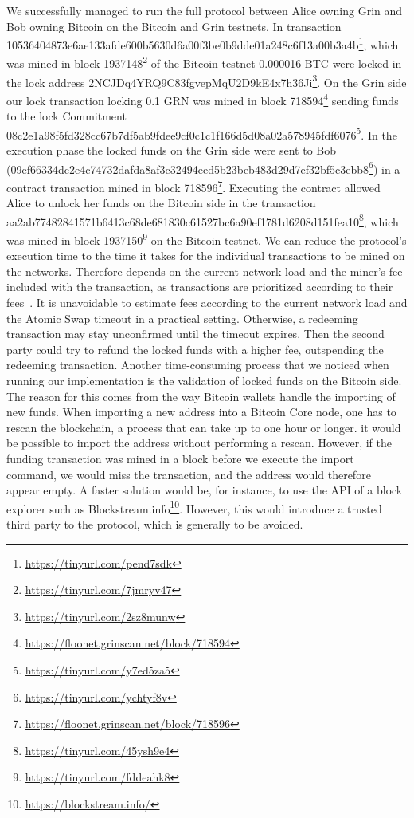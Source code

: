 We successfully managed to run the full protocol between Alice owning Grin and Bob owning Bitcoin on the Bitcoin and Grin testnets.
In transaction \\10536404873e6ae133afde600b5630d6a00f3be0b9dde01a248c6f13a00b3a4b\footnote{\url{https://tinyurl.com/pend7sdk}}, which was mined in block 1937148\footnote{\url{https://tinyurl.com/7jmryv47}} of the Bitcoin testnet 0.000016 BTC were locked in the lock address 2NCJDq4YRQ9C83fgvepMqU2D9kE4x7h36Ji\footnote{\url{https://tinyurl.com/2sz8munw}}.
On the Grin side our lock transaction locking 0.1 GRN was mined in block 718594\footnote{\url{https://floonet.grinscan.net/block/718594}} sending funds to the lock Commitment \\08c2e1a98f5fd328cc67b7df5ab9fdee9cf0c1c1f166d5d08a02a578945fdf6076\footnote{\url{https://tinyurl.com/y7ed5za5}}.
In the execution phase the locked funds on the Grin side were sent to Bob \\(09ef66334dc2e4c74732dafda8af3c32494eed5b23beb483d29d7ef32bf5c3ebb8\footnote{\url{https://tinyurl.com/ychtyf8v}}) in a contract transaction mined in block 718596\footnote{\url{https://floonet.grinscan.net/block/718596}}.
Executing the contract allowed Alice to unlock her funds on the Bitcoin side in the transaction \\ aa2ab77482841571b6413c68de681830c61527bc6a90ef1781d6208d151fea10\footnote{\url{https://tinyurl.com/45ysh9e4}}, which was mined in block 1937150\footnote{\url{https://tinyurl.com/fddeahk8}} on the Bitcoin testnet.
We can reduce the protocol's execution time to the time it takes for the individual transactions to be mined on the networks.
Therefore depends on the current network load and the miner's fee included with the transaction, as transactions are prioritized according to their fees~\cite{kasahara2016effect}.
It is unavoidable to estimate fees according to the current network load and the Atomic Swap timeout in a practical setting.
Otherwise, a redeeming transaction may stay unconfirmed until the timeout expires.
Then the second party could try to refund the locked funds with a higher fee, outspending the redeeming transaction.
Another time-consuming process that we noticed when running our implementation is the validation of locked funds on the Bitcoin side.
The reason for this comes from the way Bitcoin wallets handle the importing of new funds.
When importing a new address into a Bitcoin Core node, one has to rescan the blockchain, a process that can take up to one hour or longer.
it would be possible to import the address without performing a rescan.
However, if the funding transaction was mined in a block before we execute the import command, we would miss the transaction, and the address would therefore appear empty.
A faster solution would be, for instance, to use the API of a block explorer such as Blockstream.info\footnote{\url{https://blockstream.info/}}.
However, this would introduce a trusted third party to the protocol, which is generally to be avoided.


